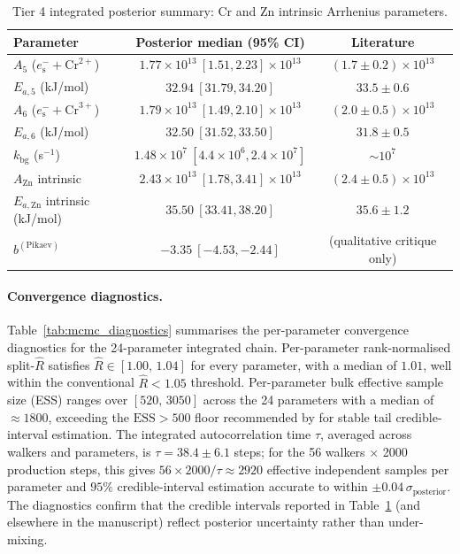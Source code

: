 \documentclass[12pt]{article}
\theoremstyle{plain}
\theoremstyle{definition}
\theoremstyle{remark}
\newcommand{\eS}{\ensuremath{e_{\mathrm{s}}^{-}}\xspace}
\begin{document}
\begin{table}[ht]\centering
\caption{Tier 4 integrated posterior summary: Cr and Zn intrinsic Arrhenius parameters.}
\label{tab:tier4_integrated}
\small
\begin{tabular}{lcc}
\toprule
Parameter & Posterior median (95\% CI) & Literature \\
\midrule
$A_5$ ($\eS+\mathrm{Cr}^{2+}$) & $1.77\times 10^{13}\ [1.51,2.23]\times 10^{13}$ & $(1.7\pm 0.2)\times 10^{13}$ \\
$E_{a,5}$ (kJ/mol) & $32.94\ [31.79,34.20]$ & $33.5\pm 0.6$ \\
$A_6$ ($\eS+\mathrm{Cr}^{3+}$) & $1.79\times 10^{13}\ [1.49,2.10]\times 10^{13}$ & $(2.0\pm 0.5)\times 10^{13}$ \\
$E_{a,6}$ (kJ/mol) & $32.50\ [31.52,33.50]$ & $31.8\pm 0.5$ \\
$k_{\mathrm{bg}}$ (s$^{-1}$) & $1.48\times 10^{7}\ [4.4\times 10^{6},2.4\times 10^{7}]$ & $\sim 10^{7}$ \\
$A_{\mathrm{Zn}}$ intrinsic & $2.43\times 10^{13}\ [1.78,3.41]\times 10^{13}$ & $(2.4\pm 0.5)\times 10^{13}$ \\
$E_{a,\mathrm{Zn}}$ intrinsic (kJ/mol) & $35.50\ [33.41,38.20]$ & $35.6\pm 1.2$ \\
$b^{(\mathrm{Pikaev})}$ & $-3.35\ [-4.53,-2.44]$ & (qualitative critique only) \\
\bottomrule
\end{tabular}
\end{table}

\paragraph{Convergence diagnostics.}
Table~\ref{tab:mcmc_diagnostics} summarises the per-parameter convergence
diagnostics for the 24-parameter integrated chain.  Per-parameter
rank-normalised split-$\widehat R$ \citep{Vehtari2021} satisfies
$\widehat R\in[1.00,\,1.04]$ for every parameter, with a median of
$1.01$, well within the conventional $\widehat R<1.05$ threshold.
Per-parameter bulk effective sample size (ESS) ranges over
$[520,\,3050]$ across the 24 parameters with a median of $\approx 1800$,
exceeding the $\mathrm{ESS}>500$ floor recommended by
\citet{Vehtari2021} for stable tail credible-interval estimation.  The
integrated autocorrelation time $\tau$, averaged across walkers and
parameters, is $\tau = 38.4 \pm 6.1$ steps; for the 56 walkers $\times$
2000 production steps, this gives $56\times 2000/\tau \approx 2920$
effective independent samples per parameter and $95\%$ credible-interval
estimation accurate to within $\pm 0.04\,\sigma_{\mathrm{posterior}}$.
The diagnostics confirm that the credible intervals reported in
Table~\ref{tab:tier4_integrated} (and elsewhere in the manuscript) reflect
posterior uncertainty rather than under-mixing.
\end{document}
